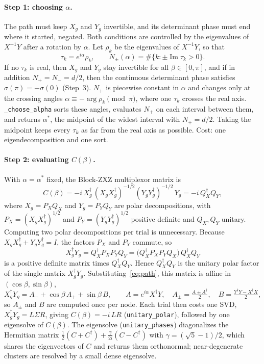 \documentclass[11pt]{article}
\begin{document}
\paragraph{Step 1: choosing $\alpha$.} The path must keep $X_g$ and $Y_g$ invertible, and its
determinant phase must end where it started, negated. Both conditions are controlled by the
eigenvalues of $X^{-1}Y$ after a rotation by $\alpha$. Let $\rho_k$ be the eigenvalues of
$X^{-1}Y$, so that
\begin{equation}\label{eq:N}
\tau_k=e^{i\alpha}\rho_k,\qquad N_\pm(\alpha)=\#\{k:\pm\operatorname{Im}\tau_k>0\}.
\end{equation}
If no $\tau_k$ is real, then $X_g$ and $Y_g$ stay invertible for all $\beta\in[0,\pi]$, and if in
addition $N_+=N_-=d/2$, then the continuous determinant phase satisfies $\sigma(\pi)=-\sigma(0)$
(Step~3). $N_+$ is piecewise constant in $\alpha$ and changes only at the crossing angles
$\alpha\equiv-\arg\rho_k\pmod\pi$, where one $\tau_k$ crosses the real axis.
\texttt{\_choose\_alpha} sorts these angles, evaluates $N_+$ on each interval between them, and
returns $\alpha^\ast$, the midpoint of the widest interval with $N_+=d/2$. Taking the midpoint
keeps every $\tau_k$ as far from the real axis as possible. Cost: one eigendecomposition and one
sort.

\paragraph{Step 2: evaluating $C(\beta)$.} With $\alpha=\alpha^\ast$ fixed, the Block-ZXZ
multiplexor matrix is
\begin{equation}\label{eq:Cdef}
C(\beta)=-i\,X_g^\dagger\,(X_gX_g^\dagger)^{-1/2}(Y_gY_g^\dagger)^{-1/2}\,Y_g=-i\,Q_X^\dagger Q_Y,
\end{equation}
where $X_g=P_XQ_X$ and $Y_g=P_YQ_Y$ are polar decompositions, with $P_X=(X_gX_g^\dagger)^{1/2}$ and
$P_Y=(Y_gY_g^\dagger)^{1/2}$ positive definite and $Q_X,Q_Y$ unitary. Computing two polar
decompositions per trial is unnecessary. Because $X_gX_g^\dagger+Y_gY_g^\dagger=I$, the factors
$P_X$ and $P_Y$ commute, so
\[
X_g^\dagger Y_g=Q_X^\dagger P_XP_YQ_Y=\big(Q_X^\dagger P_XP_YQ_X\big)\,Q_X^\dagger Q_Y
\]
is a positive definite matrix times $Q_X^\dagger Q_Y$. Hence $Q_X^\dagger Q_Y$ is the unitary polar
factor of the single matrix $X_g^\dagger Y_g$. Substituting~\eqref{eq:path}, this matrix is affine
in $(\cos\beta,\sin\beta)$,
\begin{equation}\label{eq:M}
X_g^\dagger Y_g=A_-+\cos\beta\,A_++\sin\beta\,B,\qquad
A=e^{i\alpha}X^\dagger Y,\quad A_\pm=\tfrac{A\pm A^\dagger}2,\quad
B=\tfrac{Y^\dagger Y-X^\dagger X}2,
\end{equation}
so $A_\pm$ and $B$ are computed once per node. Each trial then costs one SVD,
$X_g^\dagger Y_g=L\Sigma R$, giving $C(\beta)=-i\,LR$ (\texttt{unitary\_polar}), followed by one
eigensolve of $C(\beta)$. The eigensolve (\texttt{unitary\_phases}) diagonalizes the Hermitian
matrix $\tfrac12(C+C^\dagger)+\tfrac{\gamma}{2i}(C-C^\dagger)$ with $\gamma=(\sqrt5-1)/2$, which
shares the eigenvectors of $C$ and returns them orthonormal; near-degenerate clusters are resolved
by a small dense eigensolve.
\end{document}
